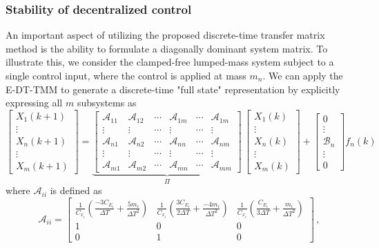 \documentclass[11pt]{ucthesis}
\newcommand{\beq}{\begin{equation}}
\newcommand{\eeq}{\end{equation}}
\begin{document}
\subsubsection{Stability of decentralized control}
\label{sec:DCproof}

An important aspect of utilizing the proposed discrete-time transfer matrix method is the ability to formulate a diagonally dominant system matrix. To illustrate this, we consider the clamped-free lumped-mass system subject to a single control input, where the control is applied at mass $m_n$. We can apply the E-DT-TMM to generate a discrete-time "full state" representation by explicitly expressing all $m$ subsystems as
\beq		\label{fullS}
\left [
\begin{array}{c}
X_1 (k+1) \\
\vdots \\
X_n (k+1) \\
\vdots \\
X_m (k+1) 
\end{array}
\right ] = \underbrace{\left [
\begin{array}{cccccc}
\mathcal{A}_{11} & \mathcal{A}_{12} & \cdots & \mathcal{A}_{1m} & \cdots & \mathcal{A}_{1m} \\
\vdots & \vdots & \cdots & \vdots &\cdots & \vdots \\
\mathcal{A}_{n1} & \mathcal{A}_{n2} & \cdots & \mathcal{A}_{nn} & \cdots & \mathcal{A}_{nm} \\
\vdots & \vdots & \cdots & \vdots &\cdots & \vdots \\
\mathcal{A}_{m1} & \mathcal{A}_{m2} & \cdots & \mathcal{A}_{mn} & \cdots &\mathcal{A}_{mm}
\end{array}
\right ]}_{\Pi} \,
\left [
\begin{array}{c}
X_1 (k) \\
\vdots \\
X_n (k) \\
\vdots \\
X_m (k) 
\end{array}
\right ] + \left [
\begin{array}{c}
0 \\
\vdots \\
\mathcal{B}_n \\
\vdots \\
0
\end{array}
\right ] f_n (k)
\eeq
where $\mathcal{A}_{ii}$ is defined as
\[
\mathcal{A}_{ii} = \begin{bmatrix}
\frac{1}{C_{x_i}}(\frac{-3C_{E_i}}{\Delta T}+\frac{5m_i}{\Delta T^2})&\frac{1}{C_{x_i}}(\frac{3C_{E_i}}{2\Delta T}+\frac{-4m_i}{\Delta T^2})&\frac{1}{C_{x_i}}(\frac{C_{E_i}}{3\Delta T}+\frac{m_i}{\Delta T^2})\\1&0&0\\0&1&0
\end{bmatrix} \,,
\]
\end{document}
